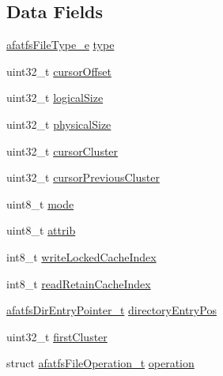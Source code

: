 \subsection*{Data Fields}
\begin{DoxyCompactItemize}
\item 
\hyperlink{asyncfatfs_8c_a2d943153b926f90a43b45fac322e10df}{afatfs\+File\+Type\+\_\+e} \hyperlink{structafatfsFile__t_aad216d36b3b37885f775486e7e9df06f}{type}
\item 
uint32\+\_\+t \hyperlink{structafatfsFile__t_a8678c8b4a7ec1e3f42abaa7c52ee072b}{cursor\+Offset}
\item 
uint32\+\_\+t \hyperlink{structafatfsFile__t_ae2c2820c2fa2a6ffee93277012cb8154}{logical\+Size}
\item 
uint32\+\_\+t \hyperlink{structafatfsFile__t_ab53943432ab06960d593296dbb50c582}{physical\+Size}
\item 
uint32\+\_\+t \hyperlink{structafatfsFile__t_a4036e8bb690fb081231a39cd8928f339}{cursor\+Cluster}
\item 
uint32\+\_\+t \hyperlink{structafatfsFile__t_a7cde00f6278a2221a0dedaadd2e2665c}{cursor\+Previous\+Cluster}
\item 
uint8\+\_\+t \hyperlink{structafatfsFile__t_adb8bf0b607d96cd7e5931331b386bfcd}{mode}
\item 
uint8\+\_\+t \hyperlink{structafatfsFile__t_a89e8cc73a03e0f0b6caf751b76784748}{attrib}
\item 
int8\+\_\+t \hyperlink{structafatfsFile__t_afb0932f6f78d43535cc6736ed96ab6a5}{write\+Locked\+Cache\+Index}
\item 
int8\+\_\+t \hyperlink{structafatfsFile__t_afdd843dde7d469bec8a279356157db07}{read\+Retain\+Cache\+Index}
\item 
\hyperlink{structafatfsDirEntryPointer__t}{afatfs\+Dir\+Entry\+Pointer\+\_\+t} \hyperlink{structafatfsFile__t_a7d179ea32a32b8e841432bc6aa48f90a}{directory\+Entry\+Pos}
\item 
uint32\+\_\+t \hyperlink{structafatfsFile__t_ae30b166fa89b854403f413d9177106d3}{first\+Cluster}
\item 
struct \hyperlink{structafatfsFileOperation__t}{afatfs\+File\+Operation\+\_\+t} \hyperlink{structafatfsFile__t_a44aa2ed047680abcdf64a577bb82f172}{operation}
\end{DoxyCompactItemize}


